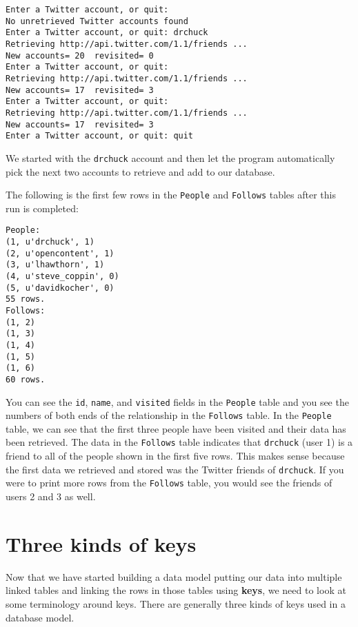 \beforeverb
\begin{verbatim}
Enter a Twitter account, or quit: 
No unretrieved Twitter accounts found
Enter a Twitter account, or quit: drchuck
Retrieving http://api.twitter.com/1.1/friends ...
New accounts= 20  revisited= 0
Enter a Twitter account, or quit: 
Retrieving http://api.twitter.com/1.1/friends ...
New accounts= 17  revisited= 3
Enter a Twitter account, or quit: 
Retrieving http://api.twitter.com/1.1/friends ...
New accounts= 17  revisited= 3
Enter a Twitter account, or quit: quit
\end{verbatim}
\afterverb
%
We started with the {\tt drchuck} account and then let the program
automatically pick the next two accounts to retrieve and add to 
our database.

The following is the first few rows in the {\tt People} 
and {\tt Follows} tables after this run is completed:

\beforeverb
\begin{verbatim}
People:
(1, u'drchuck', 1)
(2, u'opencontent', 1)
(3, u'lhawthorn', 1)
(4, u'steve_coppin', 0)
(5, u'davidkocher', 0)
55 rows.
Follows:
(1, 2)
(1, 3)
(1, 4)
(1, 5)
(1, 6)
60 rows.
\end{verbatim}
\afterverb
%
You can see the {\tt id}, {\tt name}, and {\tt visited} fields in the 
{\tt People} table and you see the numbers of both ends of 
the relationship in the {\tt Follows} table.   
In the {\tt People} table, we can see that the first three people
have been visited and their data has been retrieved.
The data in the {\tt Follows} table indicates that
{\tt drchuck} (user 1) is a friend to all of the people shown in the first
five rows.  This makes sense because
the first data we retrieved and stored was the Twitter friends of
{\tt drchuck}.  If you were to print more rows from the {\tt Follows} table,
you would see the friends of users 2 and 3 as well.

\section{Three kinds of keys}

Now that we have started building a data model putting our
data into multiple linked tables and linking the rows in those
tables using {\bf keys}, we need to look at some terminology 
around keys.  There are generally three kinds of keys used 
in a database model.

